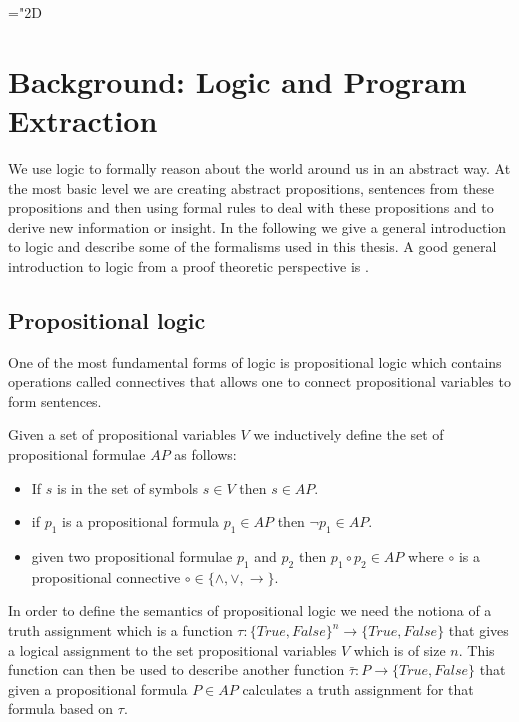 \mathchardef\mhyphen="2D
\newcommand{\mathass}[1]{\mathrm{[}#1 {]}}
\chapter{Background: Logic and Program Extraction}
We use logic to formally reason about the world around us in an abstract way. At the most basic level we are creating abstract propositions, sentences from these propositions and then using formal rules to deal with these propositions and to derive new information or insight. In the following we give a general introduction to logic and describe some of the formalisms used in this thesis.
A good general introduction to logic from a proof theoretic perspective is \cite{HandBookProof}.


\section{Propositional logic}
One of the most fundamental forms of logic is propositional logic which contains operations called connectives that allows one to connect propositional variables to form sentences.


\begin{mydef}
Given a set of propositional variables $V$ we inductively define the set of propositional formulae $AP$ as follows:
\begin{itemize}
\item If $s$ is in the set of symbols $s \in V$ then $s \in AP$.

\item if $p_1$ is a propositional formula $p_1 \in AP$ then $\neg p_1 \in AP$.

\item given two propositional formulae $p_1$ and $p_2$ then $p_1 \circ p_2 \in AP$ where $\circ$ is a propositional connective $\circ \in \{ \wedge,\vee,\to \} $.
\end{itemize} 
\end{mydef}
In order to define the semantics of propositional logic we need the notiona of a truth assignment which is a function $\tau : \{True,False\}^n \to \{True, False\}$ that gives a logical assignment to the set propositional variables $V$ which is of size $n$. This function can then be used to describe another function $\bar{\tau} : P \to \{True, False\}$ that given a propositional formula $P \in AP$ calculates a truth assignment for that formula based on $\tau$.

